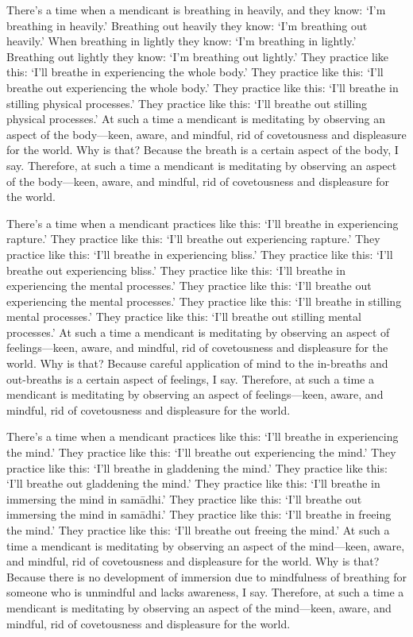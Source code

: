 \documentclass[12pt,openany]{book}%
\begin{document}
There’s a time when a mendicant is breathing in heavily, and they know: ‘I’m breathing in heavily.’ Breathing out heavily they know: ‘I’m breathing out heavily.’ When breathing in lightly they know: ‘I’m breathing in lightly.’ Breathing out lightly they know: ‘I’m breathing out lightly.’ They practice like this: ‘I’ll breathe in experiencing the whole body.’ They practice like this: ‘I’ll breathe out experiencing the whole body.’ They practice like this: ‘I’ll breathe in stilling physical processes.’ They practice like this: ‘I’ll breathe out stilling physical processes.’ At such a time a mendicant is meditating by observing an aspect of the body—keen, aware, and mindful, rid of covetousness and displeasure for the world. Why is that? Because the breath is a certain aspect of the body, I say. Therefore, at such a time a mendicant is meditating by observing an aspect of the body—keen, aware, and mindful, rid of covetousness and displeasure for the world. 

There’s a time when a mendicant practices like this: ‘I’ll breathe in experiencing rapture.’ They practice like this: ‘I’ll breathe out experiencing rapture.’ They practice like this: ‘I’ll breathe in experiencing bliss.’ They practice like this: ‘I’ll breathe out experiencing bliss.’ They practice like this: ‘I’ll breathe in experiencing the mental processes.’ They practice like this: ‘I’ll breathe out experiencing the mental processes.’ They practice like this: ‘I’ll breathe in stilling mental processes.’ They practice like this: ‘I’ll breathe out stilling mental processes.’ At such a time a mendicant is meditating by observing an aspect of feelings—keen, aware, and mindful, rid of covetousness and displeasure for the world. Why is that? Because careful application of mind to the in-breaths and out-breaths is a certain aspect of feelings, I say. Therefore, at such a time a mendicant is meditating by observing an aspect of feelings—keen, aware, and mindful, rid of covetousness and displeasure for the world. 

There’s a time when a mendicant practices like this: ‘I’ll breathe in experiencing the mind.’ They practice like this: ‘I’ll breathe out experiencing the mind.’ They practice like this: ‘I’ll breathe in gladdening the mind.’ They practice like this: ‘I’ll breathe out gladdening the mind.’ They practice like this: ‘I’ll breathe in immersing the mind in \textsanskrit{samādhi}.’ They practice like this: ‘I’ll breathe out immersing the mind in \textsanskrit{samādhi}.’ They practice like this: ‘I’ll breathe in freeing the mind.’ They practice like this: ‘I’ll breathe out freeing the mind.’ At such a time a mendicant is meditating by observing an aspect of the mind—keen, aware, and mindful, rid of covetousness and displeasure for the world. Why is that? Because there is no development of immersion due to mindfulness of breathing for someone who is unmindful and lacks awareness, I say. Therefore, at such a time a mendicant is meditating by observing an aspect of the mind—keen, aware, and mindful, rid of covetousness and displeasure for the world. 
\end{document}
